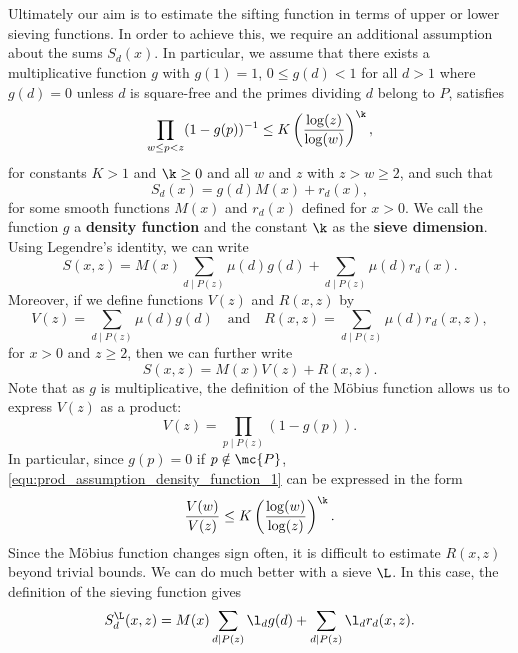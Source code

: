   \section{}
    Ultimately our aim is to estimate the sifting function in terms of upper or lower sieving functions. In order to achieve this, we require an additional assumption about the sums $S_{d}(x)$. In particular, we assume that there exists a multiplicative function $g$ with $g(1) = 1$, $0 \le g(d) < 1$ for all $d > 1$ where $g(d) = 0$ unless $d$ is square-free and the primes dividing $d$ belong to ${P}$, satisfies
    \begin{equation}\label{equ:prod_assumption_density_function_1}
      \prod_{w \le p < z}(1-g(p))^{-1} \le K\left(\frac{\log(z)}{\log(w)}\right)^{\k},
    \end{equation}
    for constants $K > 1$ and $\k \ge 0$ and all $w$ and $z$ with $z > w \ge 2$, and such that  
    \begin{equation}\label{equ:d_multiple_sifting_function}
      S_{d}(x) = g(d)M(x)+r_{d}(x),
    \end{equation}
    for some smooth functions $M(x)$ and $r_{d}(x)$ defined for $x > 0$. We call the function $g$ a \textbf{density function} and the constant $\k$ as the \textbf{sieve dimension}. Using Legendre's identity, we can write
    \[
      S(x,z) = M(x)\sum_{d \mid P(z)}\mu(d)g(d)+\sum_{d \mid P(z)}\mu(d)r_{d}(x).
    \]
    Moreover, if we define functions $V(z)$ and $R(x,z)$ by
    \[
      V(z) = \sum_{d \mid P(z)}\mu(d)g(d) \quad \text{and} \quad R(x,z) = \sum_{d \mid P(z)}\mu(d)r_{d}(x,z),
    \]
    for $x > 0$ and $z \ge 2$, then we can further write
    \[
      S(x,z) = M(x)V(z)+R(x,z).
    \]
    Note that as $g$ is multiplicative, the definition of the M\"obius function allows us to express $V(z)$ as a product:
    \[
      V(z) = \prod_{p \mid P(z)}(1-g(p)).
    \]
    In particular, since $g(p) = 0$ if $p \notin \mc{P}$, \cref{equ:prod_assumption_density_function_1} can be expressed in the form
    \begin{equation}\label{equ:prod_assumption_density_function_2}
      \frac{V(w)}{V(z)} \le K\left(\frac{\log(w)}{\log(z)}\right)^{\k}.
    \end{equation}
    Since the M\"obius function changes sign often, it is difficult to estimate $R(x,z)$ beyond trivial bounds. We can do much better with a sieve $\L$. In this case, the definition of the sieving function gives
    \[
      S_{d}^{\L}(x,z) = M(x)\sum_{d \mid P(z)}\l_{d}g(d)+\sum_{d \mid P(z)}\l_{d}r_{d}(x,z).
    \]
